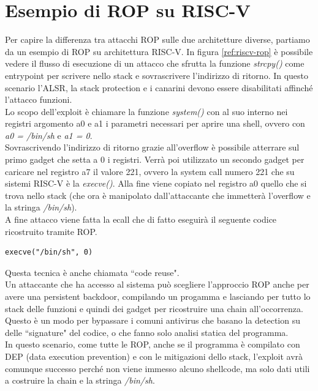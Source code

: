 \section*{Esempio di ROP su RISC-V}
Per capire la differenza tra attacchi ROP sulle due architetture diverse, partiamo da un esempio di ROP su architettura RISC-V. In figura \ref{ref:riscv-rop} è possibile vedere il flusso di esecuzione di un attacco che sfrutta la funzione \textit{strcpy()} come entrypoint per scrivere nello stack e sovrascrivere l'indirizzo di ritorno. In questo scenario l'ALSR, la stack protection e i canarini devono essere disabilitati affinché l'attacco funzioni.\\
\newline
Lo scopo dell'exploit è chiamare la funzione \textit{system()} con al suo interno nei registri argomento a0 e a1 i parametri necessari per aprire una shell, ovvero con \textit{a0 = /bin/sh} e \textit{a1 = 0}.\\
Sovrascrivendo l'indirizzo di ritorno grazie all'overflow è possibile atterrare sul primo gadget che setta a 0 i registri. Verrà poi utilizzato un secondo gadget per caricare nel registro a7 il valore 221, ovvero la system call numero 221 che su sistemi RISC-V è la \textit{execve()}. Alla fine viene copiato nel registro a0 quello che si trova nello stack (che ora è manipolato dall'attaccante che immetterà l'overflow e la stringa \textit{/bin/sh}).\\
A fine attacco viene fatta la ecall che di fatto eseguirà il seguente codice ricostruito tramite ROP.
\begin{verbatim}
execve("/bin/sh", 0)
\end{verbatim} 
Questa tecnica è anche chiamata ``code reuse".\\
\newline
Un attaccante che ha accesso al sistema può scegliere l'approccio ROP anche per avere una persistent backdoor, compilando un progamma e lasciando per tutto lo stack delle funzioni e quindi dei gadget per ricostruire una chain all'occorrenza. Questo è un modo per bypassare i comuni antivirus che basano la detection su delle ``signature" del codice, o che fanno solo analisi statica del programma.\\
In questo scenario, come tutte le ROP, anche se il programma è compilato con DEP (data execution prevention) e con le mitigazioni dello stack, l'exploit avrà comunque successo perché non viene immesso alcuno shellcode, ma solo dati utili a costruire la chain e la stringa \textit{/bin/sh}.
